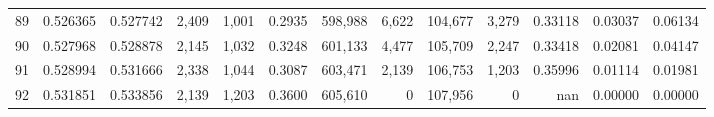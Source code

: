 \begin{tabular}{rrrrrrrrrrrrr}
89 &  0.526365 &  0.527742 &   2,409 &  1,001 &                                     0.2935 &  598,988 &    6,622 &  104,677 &    3,279 &  0.33118 &  0.03037 &  0.06134 \\
90 &  0.527968 &  0.528878 &   2,145 &  1,032 &                                     0.3248 &  601,133 &    4,477 &  105,709 &    2,247 &  0.33418 &  0.02081 &  0.04147 \\
91 &  0.528994 &  0.531666 &   2,338 &  1,044 &                                     0.3087 &  603,471 &    2,139 &  106,753 &    1,203 &  0.35996 &  0.01114 &  0.01981 \\
92 &  0.531851 &  0.533856 &   2,139 &  1,203 &                                     0.3600 &  605,610 &        0 &  107,956 &        0 &      nan &  0.00000 &  0.00000 \\
\bottomrule
\end{tabular}
